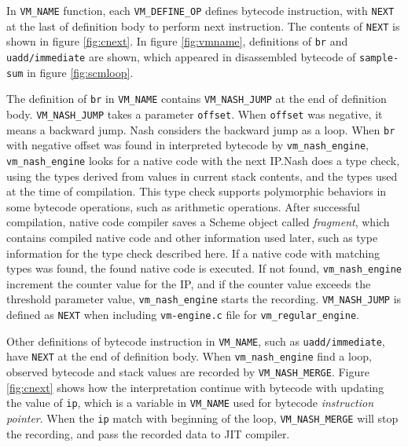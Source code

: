 \documentclass[preprint, numbers]{sigplanconf}
\begin{document}
In \texttt{VM\_NAME} function, each \texttt{VM\_DEFINE\_OP} defines bytecode
instruction, with \texttt{NEXT} at the last of definition body to perform next
instruction. The contents of \texttt{NEXT} is shown in figure
\hyperref[fig:cnext]{\ref{fig:cnext}}. In figure
\hyperref[fig:vmname]{\ref{fig:vmname}}, definitions of \texttt{br} and
\texttt{uadd/immediate} are shown, which appeared in disassembled bytecode of
\texttt{sample-sum} in figure \hyperref[fig:scmloop]{\ref{fig:scmloop}}.

The definition of \texttt{br} in \texttt{VM\_NAME} contains
\texttt{VM\_NASH\_JUMP} at the end of definition body. \texttt{VM\_NASH\_JUMP}
takes a parameter \texttt{offset}. When \texttt{offset} was negative, it means
a backward jump. Nash considers the backward jump as a loop. When \texttt{br}
with negative offset was found in interpreted bytecode by
\texttt{vm\_nash\_engine}, \texttt{vm\_nash\_engine} looks for a native code
with the next IP.\@ Nash does a type check, using the types derived from
values in current stack contents, and the types used at the time of
compilation. This type check supports polymorphic behaviors in some bytecode
operations, such as arithmetic operations. After successful compilation,
native code compiler saves a Scheme object called \textit{fragment}, which
contains compiled native code and other information used later, such as type
information for the type check described here. If a native code with matching
types was found, the found native code is executed. If not found,
\texttt{vm\_nash\_engine} increment the counter value for the IP, and if the
counter value exceeds the threshold parameter value, \texttt{vm\_nash\_engine}
starts the recording. \texttt{VM\_NASH\_JUMP} is defined as \texttt{NEXT} when
including \texttt{vm-engine.c} file for \texttt{vm\_regular\_engine}.

Other definitions of bytecode instruction in \texttt{VM\_NAME}, such as
\texttt{uadd/immediate}, have \texttt{NEXT} at the end of definition
body. When \texttt{vm\_nash\_engine} find a loop, observed bytecode and stack
values are recorded by \texttt{VM\_NASH\_MERGE}. Figure
\hyperref[fig:cnext]{\ref{fig:cnext}} shows how the interpretation continue
with bytecode with updating the value of \texttt{ip}, which is a variable in
\texttt{VM\_NAME} used for bytecode \textit{instruction pointer}. When the
\texttt{ip} match with beginning of the loop, \texttt{VM\_NASH\_MERGE} will
stop the recording, and pass the recorded data to JIT compiler.

\end{document}
